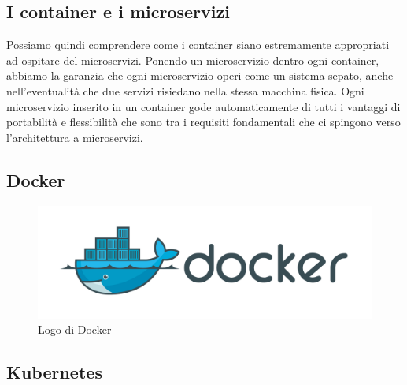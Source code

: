 \subsection{I container e i microservizi}
Possiamo quindi comprendere come i container siano estremamente appropriati ad ospitare del microservizi. Ponendo un microservizio dentro ogni container, abbiamo la garanzia che ogni microservizio operi come un sistema sepato, anche nell'eventualità che due servizi risiedano nella stessa macchina fisica. Ogni microservizio inserito in un container gode automaticamente di tutti i vantaggi di portabilità e flessibilità che sono tra i requisiti fondamentali che ci spingono verso l'architettura a microservizi.

\subsection{Docker}

\begin{figure}[h!]
	\centering
	\includegraphics[width=\textwidth,keepaspectratio=true]{capitoli/imgs/docker.png}
	\caption{Logo di Docker}
\end{figure}

\subsection{Kubernetes}
